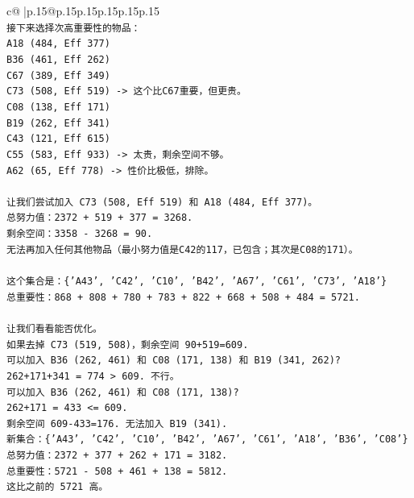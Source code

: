 \documentclass{article}
\begin{document}
{\begin{supertabular}{c@{$\;$}|p{.15\linewidth}@{}p{.15\linewidth}p{.15\linewidth}p{.15\linewidth}p{.15\linewidth}p{.15\linewidth}}
{{{\\ 
\texttt{接下来选择次高重要性的物品：} \\
\texttt{A18 (484, Eff 377)} \\
\texttt{B36 (461, Eff 262)} \\
\texttt{C67 (389, Eff 349)} \\
\texttt{C73 (508, Eff 519) {-}> 这个比C67重要，但更贵。} \\
\texttt{C08 (138, Eff 171)} \\
\texttt{B19 (262, Eff 341)} \\
\texttt{C43 (121, Eff 615)} \\
\texttt{C55 (583, Eff 933) {-}> 太贵，剩余空间不够。} \\
\texttt{A62 (65, Eff 778) {-}> 性价比极低，排除。} \\
\\ 
\texttt{让我们尝试加入 C73 (508, Eff 519) 和 A18 (484, Eff 377)。} \\
\texttt{总努力值：2372 + 519 + 377 = 3268.} \\
\texttt{剩余空间：3358 {-} 3268 = 90.} \\
\texttt{无法再加入任何其他物品（最小努力值是C42的117，已包含；其次是C08的171）。} \\
\\ 
\texttt{这个集合是：\{'A43', 'C42', 'C10', 'B42', 'A67', 'C61', 'C73', 'A18'\}} \\
\texttt{总重要性：868 + 808 + 780 + 783 + 822 + 668 + 508 + 484 = 5721.} \\
\\ 
\texttt{让我们看看能否优化。} \\
\texttt{如果去掉 C73 (519, 508)，剩余空间 90+519=609.} \\
\texttt{可以加入 B36 (262, 461) 和 C08 (171, 138) 和 B19 (341, 262)?} \\
\texttt{262+171+341 = 774 > 609. 不行。} \\
\texttt{可以加入 B36 (262, 461) 和 C08 (171, 138)?} \\
\texttt{262+171 = 433 <= 609.} \\
\texttt{剩余空间 609{-}433=176. 无法加入 B19 (341).} \\
\texttt{新集合：\{'A43', 'C42', 'C10', 'B42', 'A67', 'C61', 'A18', 'B36', 'C08'\}} \\
\texttt{总努力值：2372 + 377 + 262 + 171 = 3182.} \\
\texttt{总重要性：5721 {-} 508 + 461 + 138 = 5812.} \\
\texttt{这比之前的 5721 高。} \\
}}}
\end{supertabular}}
\end{document}

